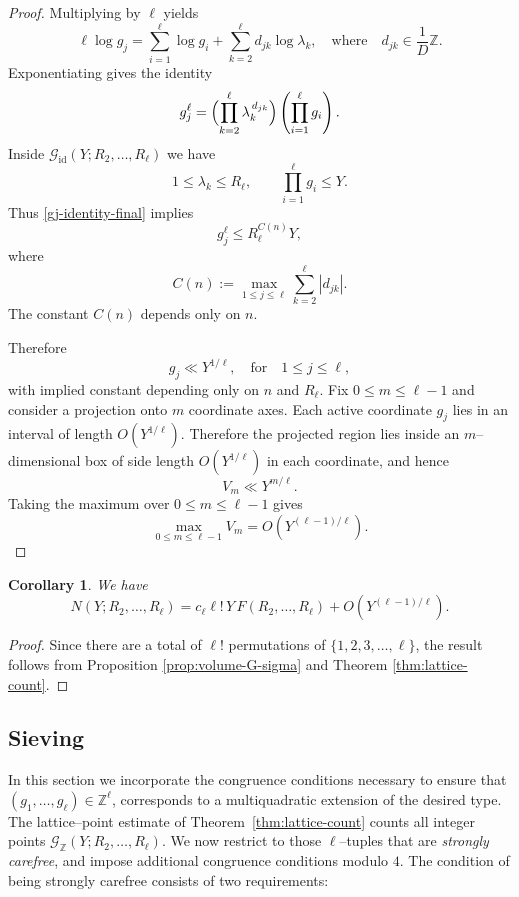 \documentclass{amsart}
\newcommand{\op}[1]{\operatorname{#1}}
\newcommand{\Z}{\mathbb{Z}}
\theoremstyle{plain}
\newtheorem{corollary}[theorem]{Corollary}
\theoremstyle{definition}
\theoremstyle{remark}
\numberwithin{equation}{section}
\begin{document}
\begin{proof}
Multiplying by $\ell$ yields
\[
\ell \log g_j
=
\sum_{i=1}^{\ell}\log g_i
+
\sum_{k=2}^{\ell}
d_{jk}\log \lambda_k,
\quad\text{where}\quad
d_{jk}\in\frac{1}{D}\Z.
\]
\noindent Exponentiating gives the identity
\begin{equation}\label{gj-identity-final}
g_j^{\ell}
=
\Bigl(
\prod_{k=2}^{\ell}
\lambda_k^{\,d_{jk}}
\Bigr)
\left(
\prod_{i=1}^{\ell} g_i
\right).
\end{equation}
Inside $\mathcal G_{\op{id}}(Y;R_2,\dots,R_\ell)$ we have
\[
1\le \lambda_k \le R_\ell,
\qquad
\prod_{i=1}^{\ell} g_i \le Y.
\]
Thus \eqref{gj-identity-final} implies
\[
g_j^{\ell}
\le
R_\ell^{C(n)} Y,
\]
where
\[
C(n)
:=
\max_{1\le j\le\ell}
\sum_{k=2}^{\ell}
|d_{jk}|.
\]
The constant $C(n)$ depends only on $n$.

Therefore
\begin{equation}\label{g_i bound}
g_j
\ll
Y^{1/\ell},
\quad \text{for}\quad
1\le j\le\ell,
\end{equation}
with implied constant depending only on $n$ and $R_\ell$.
Fix $0\le m\le \ell-1$ and consider a projection onto $m$ coordinate axes.
Each active coordinate $g_j$ lies in an interval of length
$O(Y^{1/\ell})$.
Therefore the projected region lies inside an $m$–dimensional box of side length $O(Y^{1/\ell})$ in each coordinate, and hence
\[
V_m
\ll
Y^{m/\ell}.
\]
Taking the maximum over $0\le m\le \ell-1$ gives
\[
\max_{0\le m\le \ell-1} V_m
=
O\!\left(
Y^{(\ell-1)/\ell}
\right).
\]
\end{proof}
\begin{corollary}
We have
\[
N(Y;R_2,\dots,R_\ell)
=
c_\ell \ell!
\,Y\,F(R_2,\dots,R_\ell)
+
O\!\left(
Y^{(\ell-1)/\ell}
\right).
\]
\end{corollary}

\begin{proof}
    Since there are a total of $\ell!$ permutations of $\{1, 2, 3, \dots, \ell\}$, the result follows from Proposition \ref{prop:volume-G-sigma} and Theorem \ref{thm:lattice-count}.
\end{proof}

\subsection{Sieving}

In this section we incorporate the congruence conditions necessary to ensure that
$(g_1,\dots,g_\ell)\in \mathbb Z^\ell$,
corresponds to a multiquadratic extension of the desired type.
The lattice–point estimate of Theorem~\ref{thm:lattice-count}
counts all integer points 
$\mathcal G_{\mathbb Z}(Y;R_2,\dots,R_\ell)$.
We now restrict to those $\ell$–tuples that are
\emph{strongly carefree}, and impose additional congruence
conditions modulo $4$. The condition of being strongly carefree consists of two requirements:
\end{document}

